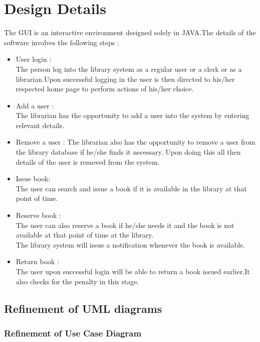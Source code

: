 \documentclass[a4paper]{article}
\begin{document}
\section{Design Details}
The GUI is an interactive environment designed solely in JAVA.The details of the software involves the following steps :
\begin{itemize}
\item User login :
\\The person log into the library system as a regular user or a clerk or as a librarian.Upon successful logging in the user is then directed to his/her respected home page to perform actions of his/her choice.
\item Add a user :
\\The librarian has the opportunity to add a user into the system by entering relevant details.
\item Remove a user :
The librarian also has the opportunity to remove a user from the library database if he/she finds it necessary. Upon doing this all then details of the user is removed from the system.
\item Issue book: 
\\The user can search and issue a book if it is available in the library at that point of time.
\item Reserve book : 
\\The user can also reserve a book if he/she needs it and the book is not available at that point of time at the library.
\\The library system will issue a notification whenever the book is available.
\item Return book : 
\\The user upon successful login will be able to return a book issued earlier.It also checks for the penalty in this stage.

\end{itemize}
\subsection{Refinement of UML diagrams}

\subsubsection{Refinement of Use Case Diagram}
\end{document}
